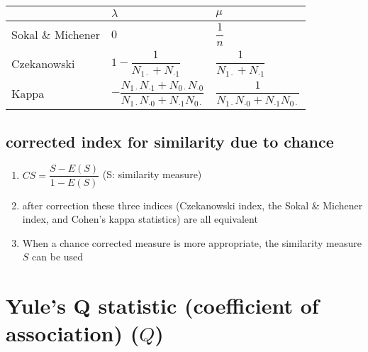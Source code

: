\renewcommand{\arraystretch}{2.7}
\begin{table}[H]
    \centering
    \begin{tabular}{|l|l|l|}
        \hline
    
        & $\lambda$ & $\mu$ \\
        \hline
    
        Sokal \& Michener \cite{ism-1} &  $0$ & $\dfrac{1}{n}$ \\
        \hline
    
        Czekanowski \cite{ism-1} & $1 - \dfrac{1}{N_{1\cdot} + N_{\cdot 1}}$ & $\dfrac{1}{N_{1\cdot} + N_{\cdot 1}}$ \\
        \hline

        Kappa \cite{ism-1} & $-\dfrac{N_{1\cdot }N_{\cdot 1} + N_{0\cdot }N_{\cdot 0}}{N_{1\cdot }N_{\cdot 0} + N_{\cdot 1}N_{0\cdot }}$ & $\dfrac{1}{N_{1\cdot }N_{\cdot 0} + N_{\cdot 1}N_{0\cdot }}$ \\
        \hline

        
    \end{tabular}
\end{table}
\renewcommand{\arraystretch}{1}

\subsection{corrected index for similarity due to chance \cite{ism-1}} \label{corrected index for similarity due to chance}

\begin{enumerate}
    \item[] $CS = \dfrac{S - E(S)}{1 - E(S)}$
    \hfill
    (S: similarity measure)

    \item after correction these three indices (Czekanowski index, the Sokal \& Michener index, and Cohen’s kappa statistics) are all equivalent

    \item When a chance corrected measure is more appropriate, the similarity measure $S$ can be used
\end{enumerate}

\section{Yule’s Q statistic (coefficient of association) ($Q$) \cite{ism-1}}\label{Yule’s Q statistic (coefficient of association)}


